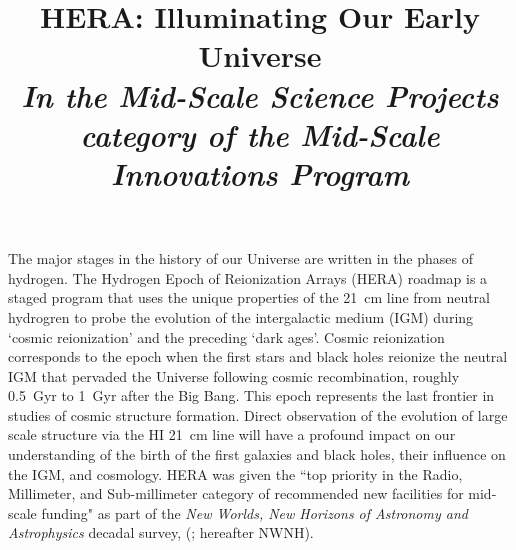 \documentclass[preprint]{aastex}
\begin{document}
\title{HERA: Illuminating Our Early Universe\\
{\it In the Mid-Scale Science Projects category of the Mid-Scale Innovations Program}} 



{ \setlength{\parindent}{0cm}
The major stages in the history of our Universe are written in the phases of hydrogen. The Hydrogen Epoch of Reionization Arrays (HERA) roadmap is a staged program that uses the unique properties of the 21~cm line from neutral hydrogren to probe the evolution of the intergalactic medium (IGM) during `cosmic reionization' and the preceding `dark ages'. Cosmic reionization corresponds to the epoch when the first stars and black holes reionize the neutral IGM that pervaded the Universe following cosmic recombination, roughly 0.5~Gyr to 1~Gyr after the Big Bang. This epoch represents the last frontier in studies of cosmic structure formation. Direct observation of the evolution of large scale structure via the HI 21~cm line will have a profound impact on our understanding of the birth of the first galaxies and black holes, their influence on the IGM, and cosmology.  HERA was given the ``top priority in the Radio, Millimeter, and Sub-millimeter category of recommended new facilities for mid-scale funding" as part of the {\it New Worlds, New Horizons of Astronomy and Astrophysics} decadal survey, (\citealt{astro2010}; hereafter NWNH).  
}
\end{document}
